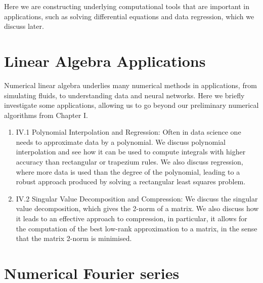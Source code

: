 \documentclass[12pt,a4paper]{book}
\theoremstyle{definition}
\begin{document}
Here we are constructing underlying computational tools that are important in applications, such as solving differential equations and data regression, which we discuss later.









\chapter{Linear Algebra Applications}

Numerical linear algebra underlies many numerical methods in applications, from simulating fluids, to understanding data
and  neural networks. Here we briefly investigate some applications, allowing us to go beyond our preliminary numerical algorithms from Chapter I.

\begin{enumerate}
\item IV.1 Polynomial Interpolation and Regression: Often in data science one needs to approximate data by a polynomial.
We discuss polynomial interpolation and see how it can be used to compute integrals with higher accuracy than rectangular or trapezium rules. We also discuss regression, where more data is used than the degree of the polynomial,
leading to a robust approach  produced by solving a rectangular least squares problem.

\item IV.2 Singular Value Decomposition and Compression: We discuss the singular value decomposition, which gives the 2-norm of a matrix.
We also discuss how it leads to an effective approach to compression, in particular, it allows for the computation of the best low-rank approximation to a matrix, in the sense that
the matrix 2-norm is minimised. 


\end{enumerate}



% 




  \chapter{Numerical Fourier series}
\end{document}
